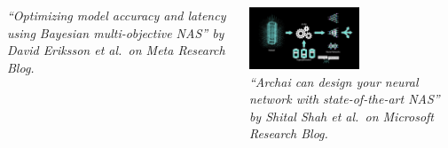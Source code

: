 \documentclass[aspectratio=169]{beamer}
\begin{document}
\begin{frame}
\begin{columns}
\begin{column}{0.33\textwidth}
\begin{center}
{\tiny \sl
``Optimizing model accuracy and latency using Bayesian multi-objective NAS''
by David Eriksson et al.\ on Meta Research Blog.\\
}
\end{center}
\end{column}
\pause
\begin{column}{0.33\textwidth}
\begin{center}
\includegraphics[height=5em]{../img/probs/microsoft-nas.png}\\
{\tiny \sl
``Archai can design your neural network with state-of-the-art NAS''
by Shital Shah et al.\ on Microsoft Research Blog.\\
}
\end{center}
\end{column}
\end{columns}
\end{frame}
\end{document}

